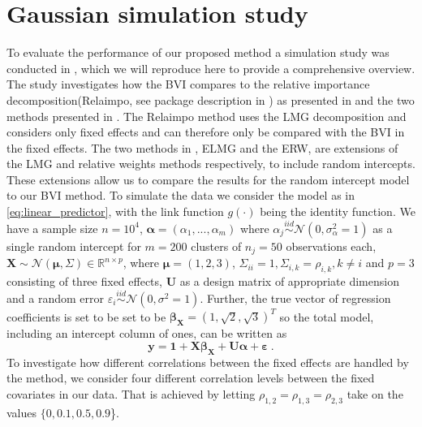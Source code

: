 \section{Gaussian simulation study}
\label{sec:simulations}
To evaluate the performance of our proposed method a simulation study was conducted in \citet{Arnstad:Relative_variable_importance_in_Bayesian_linear_mixed_models:2024}, which we will reproduce here to provide a comprehensive overview. The study investigates how the BVI compares to the relative importance decomposition(Relaimpo, see package description in \citet{groemping2023relaimpo}) as presented in \citet{gromping_relaimpo} and the two methods presented in \citet{matre}.
The Relaimpo method uses the LMG decomposition and considers only fixed effects and can therefore only be compared with the BVI in the fixed effects. The two methods in \citet{matre}, ELMG and the ERW, are extensions of the LMG and relative weights methods respectively, to include random intercepts.
These extensions allow us to compare the results for the random intercept model to our BVI method.
\newline
\newline
To simulate the data we consider the model as in \eqref{eq:linear_predictor}, with the link function $g(\cdot)$ being the identity function. We have a sample size $n=10^4$, $\boldsymbol{\alpha}=(\alpha_1, ..., \alpha_m)$ where $\alpha_j \stackrel{iid}{\sim} \mathcal{N}(0, \sigma^2_{\alpha}=1)$ as a single random intercept for $m=200$ clusters of $n_j=50$ observations each, $\mathbf{X} \sim \mathcal{N}(\boldsymbol{\mu},\Sigma) \in \mathbb{R}^{n \times p}$, where $\boldsymbol{\mu}=(1, 2, 3)$, $\Sigma_{ii} = 1, \Sigma_{i, k}=\rho_{i, k}, k\neq i$ and $p=3$ consisting of three fixed effects, $\mathbf{U}$ as a design matrix of appropriate dimension and a random error $\varepsilon_i \stackrel{iid}{\sim} \mathcal{N}(0, \sigma^2=1)$. 
Further, the true vector of regression coefficients is set to be set to be $\boldsymbol{\beta}_{\mathbf{X}}=(1, \sqrt{2}, \sqrt{3})^T$ so the total model, including an intercept column of ones, can be written as
\begin{equation}
    \label{eq:simulation_model}
    \mathbf{y} = \mathbf{1} + \mathbf{X}\boldsymbol{\beta}_{\mathbf{X}} + \mathbf{U}\boldsymbol{\alpha} + \boldsymbol{\varepsilon} \ .
\end{equation}
To investigate how different correlations between the fixed effects are handled by the method, we consider four different correlation levels between the fixed covariates in our data. That is achieved by letting $\rho_{1, 2} = \rho_{1, 3} = \rho_{2, 3}$ take on the values $\{0, 0.1, 0.5, 0.9$\}.

